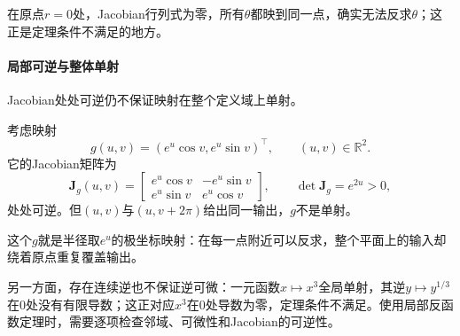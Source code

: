 在原点$r=0$处，Jacobian行列式为零，所有$\theta$都映到同一点，确实无法反求$\theta$；这正是定理条件不满足的地方。

\paragraph{局部可逆与整体单射}

Jacobian处处可逆仍不保证映射在整个定义域上单射。
\begin{example}[Jacobian处处可逆而不单射]
\label{ex:multivariable-local-not-global-inverse}
考虑映射
\[
 g(u,v)=(e^u\cos v,e^u\sin v)^\top,\qquad (u,v)\in\mathbb R^2.
\]
它的Jacobian矩阵为
\[
 \bm J_g(u,v)=\begin{bmatrix}e^u\cos v&-e^u\sin v\\ e^u\sin v&e^u\cos v\end{bmatrix},
 \qquad \det\bm J_g=e^{2u}>0,
\]
处处可逆。但$(u,v)$与$(u,v+2\pi)$给出同一输出，$g$不是单射。
\end{example}

这个$g$就是半径取$e^u$的极坐标映射：在每一点附近可以反求，整个平面上的输入却绕着原点重复覆盖输出。

另一方面，存在连续逆也不保证逆可微：一元函数$x\mapsto x^3$全局单射，其逆$y\mapsto y^{1/3}$在$0$处没有有限导数；这正对应$x^3$在$0$处导数为零，定理条件不满足。使用局部反函数定理时，需要逐项检查邻域、可微性和Jacobian的可逆性。

\FloatBarrier
